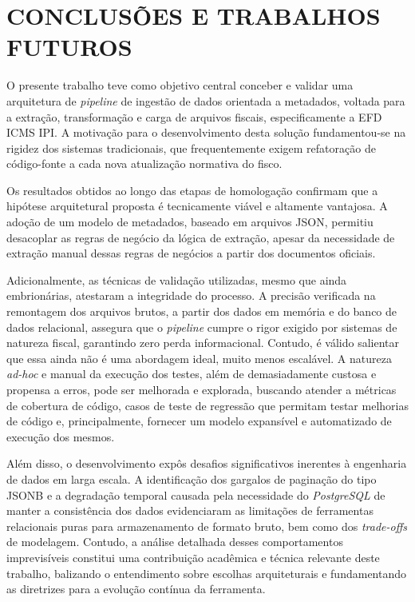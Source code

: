 \section{CONCLUSÕES E TRABALHOS FUTUROS}
\label{sec:conclusao}
O presente trabalho teve como objetivo central conceber e validar uma
arquitetura de \textit{pipeline} de ingestão de dados orientada a metadados,
voltada para a extração, transformação e carga de arquivos fiscais,
especificamente a EFD ICMS IPI. A motivação para o
desenvolvimento desta solução fundamentou-se na rigidez dos sistemas
tradicionais, que frequentemente exigem refatoração de código-fonte a cada nova
atualização normativa do fisco.

Os resultados obtidos ao longo das etapas de homologação confirmam que a
hipótese arquitetural proposta é tecnicamente viável e altamente vantajosa.
A adoção de um modelo de metadados, baseado em arquivos JSON, permitiu
desacoplar as regras de negócio da lógica de extração, apesar da necessidade de
extração manual dessas regras de negócios a partir dos documentos oficiais.

Adicionalmente, as técnicas de validação utilizadas, mesmo que ainda
embrionárias, atestaram a integridade do processo. A precisão verificada na
remontagem dos arquivos brutos, a partir dos dados em memória e do banco de
dados relacional, assegura que o \textit{pipeline} cumpre o rigor exigido por
sistemas de natureza fiscal, garantindo zero perda informacional. Contudo,
é válido salientar que essa ainda não é uma abordagem ideal, muito menos
escalável. A natureza \textit{ad-hoc} e manual da execução dos testes,
além de demasiadamente custosa e propensa a erros, pode ser melhorada e
explorada, buscando atender a métricas de cobertura de código, casos de teste de
regressão que permitam testar melhorias de código e, principalmente,
fornecer um modelo expansível e automatizado de execução dos mesmos.

Além disso, o desenvolvimento expôs desafios significativos inerentes à
engenharia de dados em larga escala. A identificação dos gargalos de paginação
do tipo JSONB e a degradação temporal causada pela necessidade do
\textit{PostgreSQL} de manter a consistência dos dados evidenciaram as
limitações de ferramentas relacionais puras para armazenamento de formato
bruto, bem como dos \textit{trade-offs} de modelagem. Contudo, a análise
detalhada desses comportamentos imprevisíveis constitui uma contribuição
acadêmica e técnica relevante deste trabalho, balizando o entendimento sobre
escolhas arquiteturais e fundamentando as diretrizes para a evolução contínua
da ferramenta.

